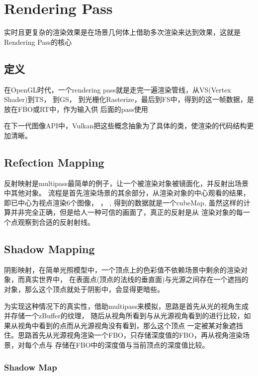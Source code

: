 \section{Rendering Pass}

实时且更复杂的渲染效果是在场景几何体上借助多次渲染来达到效果，这就是Rendering Pass的核心

\subsection{定义}

在OpenGL时代，一个rendering pass就是走完一遍渲染管线，从VS(Vertex Shader)到TS，
到GS， 到光栅化Rasterize，最后到FS中，得到的这一帧数据，是放在FBO或RT中，作为输入供
后面的pass使用

\par
在下一代图像API中，Vulkan把这些概念抽象为了具体的类，使渲染的代码结构更加清晰。


\subsection{Refection Mapping}
反射映射是multipass最简单的例子，让一个被渲染对象被镜面化，并反射出场景中其他对象。
流程是首先渲染场景的其余部分，从渲染对象的中心观看的结果，即已中心为视点渲染6个图像，
，
,
得到的数据就是一个cubeMap, 虽然这样的计算并非完全正确，但是给人一种可信的画面了，真正的反射是从
渲染对象的每一个点观察到合适的反射射线。

\subsection{Shadow Mapping}
阴影映射，在简单光照模型中，一个顶点上的色彩值不依赖场景中剩余的渲染对象，而真实世界中，
在表面点(顶点的法线的垂直面)与光源之间存在一个遮挡的对象，那么这个顶点就处于阴影中，会显得更暗些。

为实现这种情况下的真实性，借助multipass来模拟，思路是首先从光的视角生成并存储一个zBuffer的纹理，
随后从视角所看到与从光源视角看到的进行比较，如果从视角中看到的点而从光源视角没有看到，那么这个顶点
一定被某对象遮挡住。思路首先从光源视角渲染一个FBO，只存储深度值的FBO，再从视角渲染场景，对每个点与
存储在FBO中的深度值与当前顶点的深度值比较。


\subsubsection{Shadow Map}

